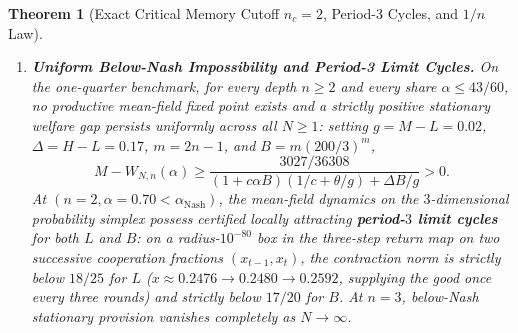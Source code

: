 \documentclass[11pt,reqno]{amsart}
\newtheorem{theorem}{Theorem}[section]
\theoremstyle{definition}
\theoremstyle{remark}
\begin{document}
\begin{theorem}[Exact Critical Memory Cutoff $n_c = 2$, Period-3 Cycles, and $1/n$ Law]
\begin{enumerate}
  \item \textbf{Uniform Below-Nash Impossibility and Period-3 Limit Cycles.} On the one-quarter benchmark, for \emph{every} depth $n \ge 2$ and \emph{every} share $\alpha \le 43/60$, no productive mean-field fixed point exists and a strictly positive stationary welfare gap persists uniformly across all $N \ge 1$: setting $g = M-L = 0.02$, $\Delta = H-L = 0.17$, $m = 2n-1$, and $B = m(200/3)^m$,
  \begin{equation}\label{eq:uniform-gap}
    M - W_{N,n}(\alpha) \ge \frac{3027/36308}{(1 + c\alpha B)(1/c + \theta/g) + \Delta B/g} > 0.
  \end{equation}
  At $(n=2, \alpha = 0.70 < \alpha_{\mathrm{Nash}})$, the mean-field dynamics on the $3$-dimensional probability simplex possess certified locally attracting \textbf{period-$3$ limit cycles} for both $L$ and $B$: on a radius-$10^{-80}$ box in the three-step return map on two successive cooperation fractions $(x_{t-1}, x_t)$, the contraction norm is strictly below $18/25$ for $L$ ($x \approx 0.2476 \to 0.2480 \to 0.2592$, supplying the good once every three rounds) and strictly below $17/20$ for $B$. At $n = 3$, below-Nash stationary provision vanishes completely as $N \to \infty$.
\end{enumerate}
\end{theorem}
\end{document}
